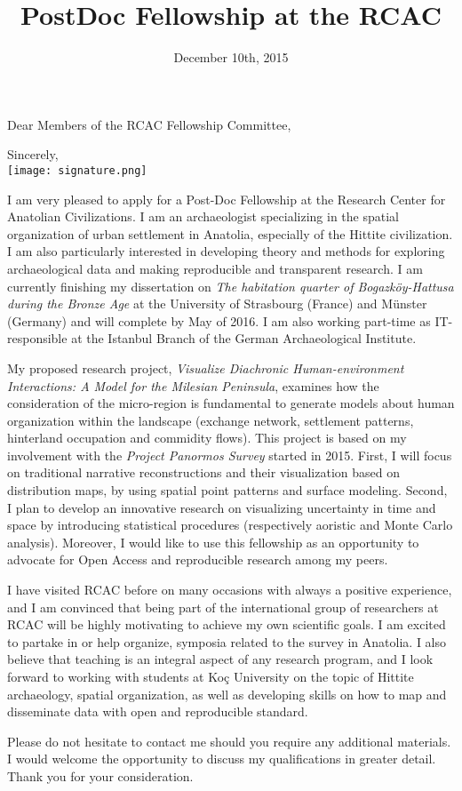 \documentclass[11pt,a4paper,sans]{moderncv}
\title{PostDoc Fellowship at the RCAC}
\begin{document}

\date{December 10th, 2015}
\opening{Dear Members of the RCAC Fellowship Committee,}
\closing{Sincerely, \\ \vspace{0.5cm} \texttt{[image: signature.png]}}
\makelettertitle

I am very pleased to apply for a Post-Doc Fellowship at the Research Center for
Anatolian Civilizations. I am an archaeologist specializing in the spatial
organization of urban settlement in Anatolia, especially of the Hittite
civilization. I am also particularly interested in developing theory and methods
for exploring archaeological data and making reproducible and transparent
research. I am currently finishing my dissertation on \textit{The habitation quarter
of Bogazköy-Hattusa during the Bronze Age} at the University of Strasbourg
(France) and Münster  (Germany) and will complete by May of 2016. I am also
working part-time as IT-responsible at the Istanbul Branch of the German
Archaeological Institute.

My proposed research project, \textit{Visualize Diachronic Human-environment
Interactions: A Model for the Milesian Peninsula}, examines how the
consideration of the micro-region is fundamental to generate models about human
organization within the landscape (exchange network, settlement patterns,
hinterland occupation and commidity flows). This project is based on my
involvement with the \textit{Project Panormos Survey} started in 2015.
First, I will focus on traditional narrative reconstructions and their
visualization based on distribution maps, by using spatial point patterns and
surface modeling. Second, I plan to develop an innovative research on
visualizing uncertainty in time and space by introducing statistical procedures
(respectively aoristic and Monte Carlo analysis). Moreover, I would like to use
this fellowship as an opportunity to advocate for Open Access and reproducible
research among my peers. 

I have visited RCAC before on many occasions with always a positive experience,
and I am convinced that being part of the international group of researchers at
RCAC will be highly motivating to achieve my own scientific goals. I am excited
to partake in or  help organize, symposia related to the survey in
Anatolia. I also believe that teaching is an integral aspect of any research
program, and I look forward to working with students at Koç University on the
topic of Hittite archaeology, spatial organization, as well as developing skills on how to
map and disseminate data with open and reproducible standard. 

 
Please do not hesitate to contact me should you require any additional
materials. I would welcome the opportunity to discuss my qualifications in
greater detail. Thank you for your consideration.


\makeletterclosing

\end{document}
